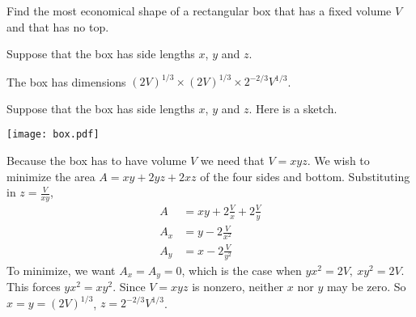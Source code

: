 \begin{question}
Find the most economical shape of a rectangular box that has
a fixed volume $V$ and that has no top.
\end{question}

\begin{hint}
Suppose that the box has side lengths $x$, $y$ and $z$.
\end{hint}

\begin{answer}
The box has dimensions $(2V)^{1/3}\times(2V)^{1/3}\times 2^{-2/3}V^{1/3}$.
\end{answer}

\begin{solution}
Suppose that the box has side lengths $x$, $y$ and $z$.
Here is a sketch.
\begin{center}
     \texttt{[image: box.pdf]}
\end{center}
Because the box has to have volume $V$ we need that $V=xyz$.
We wish to minimize the area $A=xy+2yz+2xz$ of the four sides and bottom.
Substituting in $z=\frac{V}{xy}$,
\begin{align*}
A&=xy+2\frac{V}{x}+2\frac{V}{y}\\
A_x&=y-2\frac{V}{x^2}\\
A_y&=x-2\frac{V}{y^2}
\end{align*}
To minimize, we want $A_x=A_y=0$, which is the case when $yx^2=2V,\ xy^2=2V$.
This forces $yx^2=xy^2$. Since $V=xyz$ is nonzero, neither $x$ nor $y$
may be zero. So $x=y=(2V)^{1/3}$, $z=2^{-2/3}V^{1/3}$.
\end{solution}



\subsection*{\Application}

